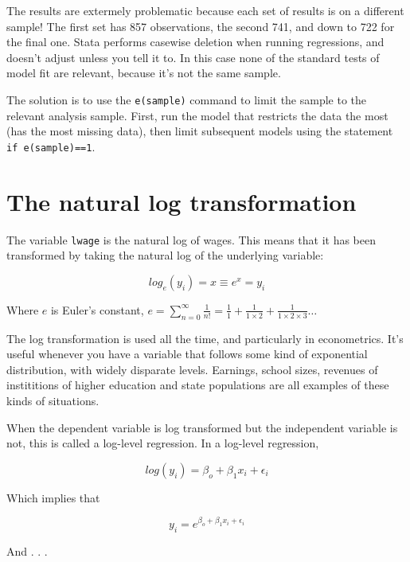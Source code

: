 \documentclass[12pt]{article}
\begin{document}
The results are extermely problematic because each set of results is
on a different sample! The first set has 857 observations, the second
741, and down to 722 for the final one. Stata performs casewise
deletion when running regressions, and doesn't adjust unless you tell
it to. In this case none of the standard tests of model fit are
relevant, because it's not the same sample. 

The solution is to use the \texttt{e(sample)} command to limit the
sample to the relevant analysis sample. First, run the model that
restricts the data the most (has the most missing data), then limit
subsequent models using the statement \texttt{if e(sample)==1}.

\section{The natural log transformation}

The variable \texttt{lwage} is the natural log of wages. This means
that it has been transformed by taking the natural log of the
underlying variable:

\begin{equation*}
  log_e(y_i)=x \equiv e^x=y_i
\end{equation*}


Where $e$ is Euler's constant, $e=\sum_{n=0}^\infty
\frac{1}{n!}=\frac{1}{1}+\frac{1}{1 \times 2}+\frac{1}{1 \times
  2 \times 3} \ldots$

The log transformation is used all the time, and particularly in
econometrics. It's useful whenever you have a variable that follows
some kind of exponential distribution, with widely disparate
levels. Earnings, school sizes, revenues of instititions of higher
education and state populations are all examples of these kinds of
situations. 

When the dependent variable is log transformed but the independent
variable is not, this is called a log-level regression. In a log-level
regression,  


\begin{equation*}
  log(y_i)=\beta_o+\beta_1x_i+\epsilon_i
\end{equation*}

Which implies that

\begin{equation*}
  y_i=e^{\beta_o+\beta_1 x_i + \epsilon_i}
\end{equation*}

And . . .
\end{document}
